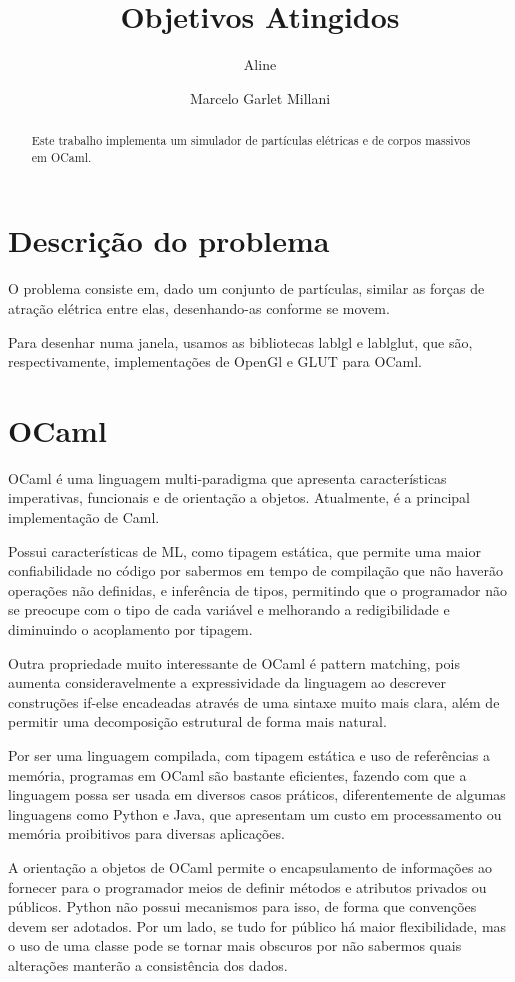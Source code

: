 \documentclass[a4paper,10pt]{article}
\title{Objetivos Atingidos}
\author{Aline \and Marcelo Garlet Millani}
\begin{document}
\maketitle

\begin{abstract}
 Este trabalho implementa um simulador de partículas elétricas e de corpos massivos em OCaml.
\end{abstract}

\section{Descrição do problema}

	O problema consiste em, dado um conjunto de partículas, similar as forças de atração elétrica entre elas, desenhando-as conforme se movem.
	
	Para desenhar numa janela, usamos as bibliotecas lablgl e lablglut, que são, respectivamente, implementações de OpenGl e GLUT para OCaml.
	
\section{OCaml}

	OCaml é uma linguagem multi-paradigma que apresenta características imperativas, funcionais e de orientação a objetos. Atualmente, é a principal implementação de Caml.
	
	Possui características de ML, como tipagem estática, que permite uma maior confiabilidade no código por sabermos em tempo de compilação que não haverão operações não definidas, e inferência de tipos, permitindo que o programador não se preocupe com o tipo de cada variável e melhorando a redigibilidade e diminuindo o acoplamento por tipagem.
	
	Outra propriedade muito interessante de OCaml é pattern matching, pois aumenta consideravelmente a expressividade da linguagem ao descrever construções if-else encadeadas através de uma sintaxe muito mais clara, além de permitir uma decomposição estrutural de forma mais natural.
	
	Por ser uma linguagem compilada, com tipagem estática e uso de referências a memória, programas em OCaml são bastante eficientes, fazendo com que a linguagem possa ser usada em diversos casos práticos, diferentemente de algumas linguagens como Python e Java, que apresentam um custo em processamento ou memória proibitivos para diversas aplicações.
	
	A orientação a objetos de OCaml permite o encapsulamento de informações ao fornecer para o programador meios de definir métodos e atributos privados ou públicos. Python não possui mecanismos para isso, de forma que convenções devem ser adotados. Por um lado, se tudo for público há maior flexibilidade, mas o uso de uma classe pode se tornar mais obscuros por não sabermos quais alterações manterão a consistência dos dados.
	
\end{document}
